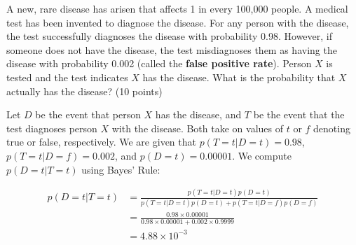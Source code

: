 \documentclass[fleqn]{homework}
\begin{document}
  \begin{problem}{4}
    \begin{question}
      A new, rare disease has arisen that affects 1 in every 100,000 people.  A
      medical test has been invented to diagnose the disease.  For any person
      with the disease, the test successfully diagnoses the disease with
      probability 0.98.  However, if someone does not have the disease, the test
      misdiagnoses them as having the disease with probability 0.002 (called the
      \textbf{false positive rate}).  Person $X$ is tested and the test
      indicates $X$ has the disease.  What is the probability that $X$ actually
      has the disease? (10 points)
    \end{question}

    Let $D$ be the event that person $X$ has the disease, and $T$ be the event
    that the test diagnoses person $X$ with the disease.  Both take on values of
    $t$ or $f$ denoting true or false, respectively.  We are given that
    $p(T=t|D=t) = 0.98$, $p(T=t|D=f)=0.002$, and $p(D=t) = 0.00001$.  We compute
    $p(D=t|T=t)$ using Bayes' Rule:

    \begin{align*}
      p(D=t|T=t) &= \frac{p(T=t|D=t)p(D=t)}{p(T=t|D=t)p(D=t) + p(T=t|D=f)p(D=f)}\\
                 &= \frac{0.98 \times 0.00001}{0.98 \times 0.00001 + 0.002 \times 0.9999}\\
                 &= 4.88 \times 10^{-3}
    \end{align*}
  \end{problem}
\end{document}

